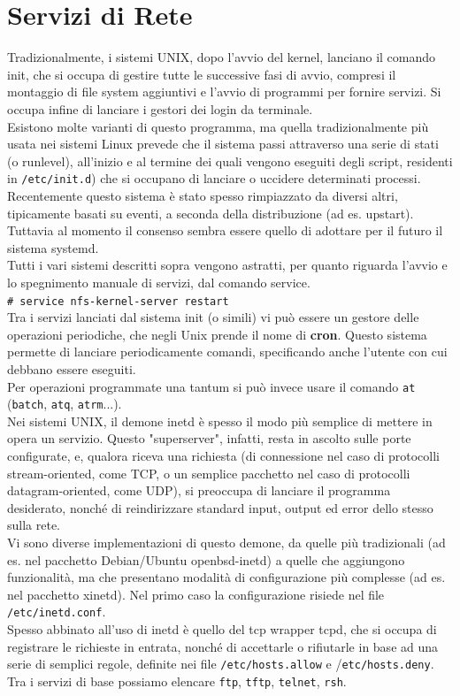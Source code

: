 \documentclass[a4paper]{report}
\newcommand\tab[1][1cm]{\hspace*{#1}}
\begin{document}
\chapter{Servizi di Rete}
Tradizionalmente, i sistemi UNIX, dopo l'avvio del kernel,
lanciano il comando init, che si occupa di gestire tutte le
successive fasi di avvio, compresi il montaggio di file
system aggiuntivi e l'avvio di programmi per fornire servizi.
Si occupa infine di lanciare i gestori dei login da terminale.\\
Esistono molte varianti di questo programma, ma quella
tradizionalmente più usata nei sistemi Linux prevede che il
sistema passi attraverso una serie di stati (o runlevel),
all'inizio e al termine dei quali vengono eseguiti degli
script, residenti in \texttt{/etc/init.d}) che si occupano di
lanciare o uccidere determinati processi.\\
Recentemente questo sistema è stato spesso
rimpiazzato da diversi altri, tipicamente basati su eventi,
a seconda della distribuzione (ad es. upstart). Tuttavia
al momento il consenso sembra essere quello di
adottare per il futuro il sistema systemd.\\
Tutti i vari sistemi descritti sopra vengono astratti, per
quanto riguarda l'avvio e lo spegnimento manuale di
servizi, dal comando service.\\
\tab\texttt{\# service nfs-kernel-server restart}\\
Tra i servizi lanciati dal sistema init (o simili) vi può
essere un gestore delle operazioni periodiche, che negli
Unix prende il nome di \textbf{cron}. Questo sistema permette
di lanciare periodicamente comandi, specificando
anche l'utente con cui debbano essere eseguiti.\\
Per operazioni programmate una tantum si può invece
usare il comando \texttt{at} (\texttt{batch}, \texttt{atq}, \texttt{atrm}...).\\
Nei sistemi UNIX, il demone inetd è spesso il modo più semplice di
mettere in opera un servizio. Questo "superserver", infatti, resta in
ascolto sulle porte configurate, e, qualora riceva una richiesta (di
connessione nel caso di protocolli stream-oriented, come TCP, o un
semplice pacchetto nel caso di protocolli datagram-oriented, come
UDP), si preoccupa di lanciare il programma desiderato, nonché di
reindirizzare standard input, output ed error dello stesso sulla rete.\\
Vi sono diverse implementazioni di questo demone, da quelle più
tradizionali (ad es. nel pacchetto Debian/Ubuntu openbsd-inetd) a
quelle che aggiungono funzionalità, ma che presentano modalità di
configurazione più complesse (ad es. nel pacchetto xinetd). Nel
primo caso la configurazione risiede nel file \texttt{/etc/inetd.conf}.\\
Spesso abbinato all'uso di inetd è quello del tcp
wrapper tcpd, che si occupa di registrare le
richieste in entrata, nonché di accettarle o rifiutarle
in base ad una serie di semplici regole, definite nei
file \texttt{/etc/hosts.allow} e /\texttt{etc/hosts.deny}.\\
Tra i servizi di base possiamo elencare \texttt{ftp},
\texttt{tftp}, \texttt{telnet}, \texttt{rsh}.\\
\end{document}

